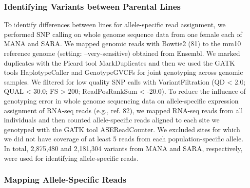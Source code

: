 \documentclass[9pt,twocolumn,twoside,lineno]{pnas-new}
\begin{document}
\hypertarget{identifying-variants-between-parental-lines}{%
\subsubsection*{Identifying Variants between Parental
Lines}\label{identifying-variants-between-parental-lines}}

To identify differences between lines for allele-specific read
assignment, we performed SNP calling on whole genome sequence data from
one female each of MANA and SARA. We mapped genomic reads with Bowtie2
(81) to the mm10 reference genome (setting: --very-sensitive) obtained
from Ensembl. We marked duplicates with the Picard tool MarkDuplicates
and then we used the GATK tools HaplotypeCaller and GenotypeGVCFs for
joint genotyping across genomic samples. We filtered for low quality SNP
calls with VariantFiltration (QD \textless{} 2.0; QUAL \textless{} 30.0;
FS \textgreater{} 200; ReadPosRankSum \textless{} -20.0). To reduce the
influence of genotyping error in whole genome sequencing data on
allele-specific expression assignment of RNA-seq reads (e.g., ref. 82),
we mapped RNA-seq reads from all individuals and then counted
allele-specific reads aligned to each site we genotyped with the GATK
tool ASEReadCounter. We excluded sites for which we did not have
coverage of at least 5 reads from each population-specific allele. In
total, 2,875,480 and 2,181,304 variants from MANA and SARA,
respectively, were used for identifying allele-specific reads.

\hypertarget{mapping-allele-specific-reads}{%
\subsubsection*{Mapping Allele-Specific
Reads}\label{mapping-allele-specific-reads}}
\end{document}
